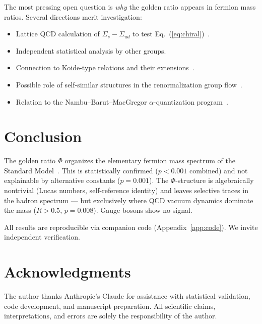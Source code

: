 \documentclass[11pt,a4paper]{article}
\begin{document}
The most pressing open question is \emph{why} the golden ratio
appears in fermion mass ratios. Several directions merit
investigation:
\begin{itemize}
  \item Lattice QCD calculation of $\Sigma_s - \Sigma_{ud}$ to test
        Eq.~(\ref{eq:chiral})~\cite{Durr2008,Gupta2021}.
  \item Independent statistical analysis by other groups.
  \item Connection to Koide-type relations and their
        extensions~\cite{GaoLi2016,RiveroGsponer2005}.
  \item Possible role of self-similar structures in the renormalization
        group flow~\cite{Goldfain2011}.
  \item Relation to the Nambu--Barut--MacGregor $\alpha$-quantization
        program~\cite{Nambu1952,Barut1979,MacGregor2007}.
\end{itemize}

\section{Conclusion}
\label{sec:conclusion}

The golden ratio $\Phi$ organizes the elementary fermion mass spectrum
of the Standard Model~\cite{PDG2024}. This is statistically confirmed ($p < 0.001$
combined) and not explainable by alternative constants ($p = 0.001$).
The $\Phi$-structure is algebraically nontrivial (Lucas numbers,
self-reference identity) and leaves selective traces in the hadron
spectrum --- but exclusively where QCD vacuum dynamics dominate the
mass ($R > 0.5$, $p = 0.008$). Gauge bosons show no signal.

All results are reproducible via companion code
(Appendix~\ref{app:code}). We invite independent verification.

\section*{Acknowledgments}

The author thanks Anthropic's Claude for assistance with statistical
validation, code development, and manuscript preparation. All scientific
claims, interpretations, and errors are solely the responsibility of the
author.
\end{document}
